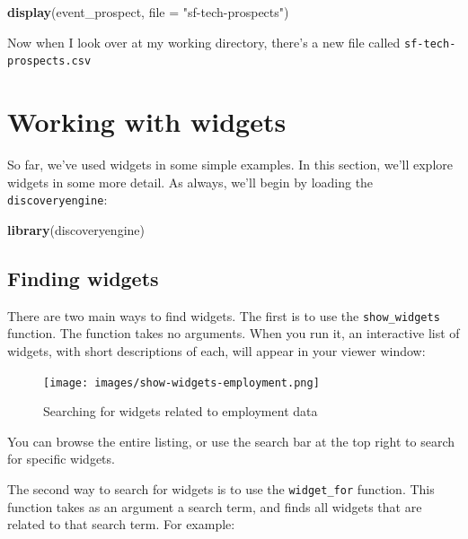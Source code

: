\documentclass[]{book}
\newenvironment{Shaded}{\begin{snugshade}}{\end{snugshade}}
\newcommand{\DataTypeTok}[1]{\textcolor[rgb]{0.13,0.29,0.53}{#1}}
\newcommand{\KeywordTok}[1]{\textcolor[rgb]{0.13,0.29,0.53}{\textbf{#1}}}
\newcommand{\NormalTok}[1]{#1}
\newcommand{\StringTok}[1]{\textcolor[rgb]{0.31,0.60,0.02}{#1}}
\begin{document}
\begin{Shaded}
\begin{Highlighting}[]
\KeywordTok{display}\NormalTok{(event_prospect, }\DataTypeTok{file =} \StringTok{"sf-tech-prospects"}\NormalTok{)}
\end{Highlighting}
\end{Shaded}

Now when I look over at my working directory, there's a new file called \texttt{sf-tech-prospects.csv}

\hypertarget{working-with-widgets}{%
\chapter{Working with widgets}\label{working-with-widgets}}

So far, we've used widgets in some simple examples. In this section, we'll explore widgets in some more detail. As always, we'll begin by loading the \texttt{discoveryengine}:

\begin{Shaded}
\begin{Highlighting}[]
\KeywordTok{library}\NormalTok{(discoveryengine)}
\end{Highlighting}
\end{Shaded}

\hypertarget{working-with-finding-widgets}{%
\section{Finding widgets}\label{working-with-finding-widgets}}

There are two main ways to find widgets. The first is to use the \texttt{show\_widgets} function. The function takes no arguments. When you run it, an interactive list of widgets, with short descriptions of each, will appear in your viewer window:

\begin{figure}
\centering
\texttt{[image: images/show-widgets-employment.png]}
\caption{Searching for widgets related to employment data}
\end{figure}

You can browse the entire listing, or use the search bar at the top right to search for specific widgets.

The second way to search for widgets is to use the \texttt{widget\_for} function. This function takes as an argument a search term, and finds all widgets that are related to that search term. For example:
\end{document}
